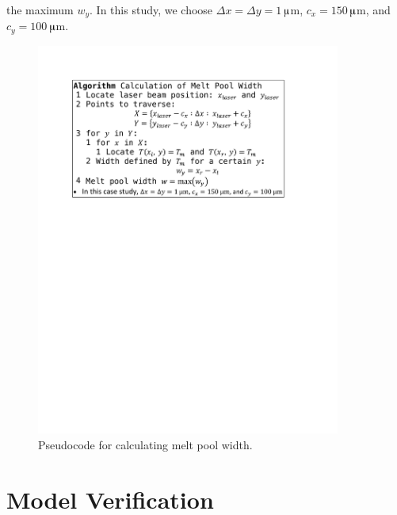\documentclass [11pt, proquest] {uwthesis}[2020/02/24]
\begin{document}
the maximum $w_{y}$. In this study, we choose $\Delta x=\Delta y=1\,$$\muup$m,
$c_{x}=150\,$$\muup$m, and $c_{y}=100\,$$\muup$m.
\begin{figure}[!ht]
\begin{centering}
\includegraphics[clip,width=10cm]{Closed-loop-simulation/pseudocode_mpw}
\par\end{centering}
\centering{}\caption{\label{fig:Pseudocode-for-calculating}Pseudocode for calculating
melt pool width.}
\end{figure}

\section{Model Verification} \label{sec:Model-Verification}
\end{document}
